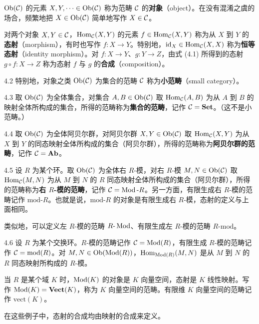 $\operatorname{Ob}(\mathcal{C})$ 的元素 $X,Y,\dots\in\operatorname{Ob}(\mathcal{C})$ 称为范畴 $\mathcal{C}$ 的\textbf{对象}（object）。在没有混淆之虞的场合，频繁地把 $X\in\operatorname{Ob}(\mathcal{C})$ 简单地写作 $X\in\mathcal{C}$。

对两个对象 $X,Y\in\mathcal{C}$，$\operatorname{Hom}_{\mathcal{C}}(X,Y)$ 的元素 $f\in\operatorname{Hom}_{\mathcal{C}}(X,Y)$ 称为从 $X$ 到 $Y$ 的\textbf{态射}（morphism），有时也写作 $f\colon X\to Y$。特别地，$\mathrm{id}_X\in\operatorname{Hom}_{\mathcal{C}}(X,X)$ 称为\textbf{恒等态射}（identity morphism）。对 $f\colon X\to Y$、$g\colon Y\to Z$，由式 (4.1) 所得到的态射 $g\circ f\colon X\to Z$ 称为态射 $f$ 与 $g$ 的\textbf{合成}（composition）。

\begin{definition}{4.2}
特别地，对象之类 $\operatorname{Ob}(\mathcal{C})$ 为集合的范畴 $\mathcal{C}$ 称为\textbf{小范畴}（small category）。
\end{definition}

\begin{example}{4.3}
取 $\operatorname{Ob}(\mathcal{C})$ 为全体集合，对集合 $A,B\in\operatorname{Ob}(\mathcal{C})$ 取 $\operatorname{Hom}_{\mathcal{C}}(A,B)$ 为从 $A$ 到 $B$ 的映射全体所构成的集合，所得的范畴称为\textbf{集合的范畴}，记作 $\mathcal{C}=\mathbf{Set}$。（这不是小范畴。）
\end{example}

\begin{example}{4.4}
取 $\operatorname{Ob}(\mathcal{C})$ 为全体阿贝尔群，对阿贝尔群 $X,Y\in\operatorname{Ob}(\mathcal{C})$ 取 $\operatorname{Hom}_{\mathcal{C}}(X,Y)$ 为从 $X$ 到 $Y$ 的同态映射全体所构成的集合（阿贝尔群），所得的范畴称为\textbf{阿贝尔群的范畴}，记作 $\mathcal{C}=\mathbf{Ab}$。
\end{example}

\begin{example}{4.5}
设 $R$ 为某个环。取 $\operatorname{Ob}(\mathcal{C})$ 为全体右 $R$-模，对右 $R$-模 $M,N\in\operatorname{Ob}(\mathcal{C})$ 取 $\operatorname{Hom}_{\mathcal{C}}(M,N)$ 为从 $M$ 到 $N$ 的 $R$ 同态映射全体所构成的集合（阿贝尔群），所得的范畴称为\textbf{右 $R$-模的范畴}，记作 $\mathcal{C}=\operatorname{Mod}\text{-}R$。另一方面，有限生成右 $R$-模的范畴记作 $\mathrm{mod}\text{-}R$。也就是说，$\mathrm{mod}\text{-}R$ 的对象是有限生成右 $R$-模，态射的定义与上面相同。

类似地，可以定义左 $R$-模的范畴 $R\text{-}\operatorname{Mod}$、有限生成左 $R$-模的范畴 $R\text{-}\mathrm{mod}$。
\end{example}

\begin{example}{4.6}
设 $R$ 为某个交换环。$R$-模的范畴记作 $\mathcal{C}=\operatorname{Mod}(R)$，有限生成 $R$-模的范畴记作 $\mathcal{C}=\mathrm{mod}(R)$。对 $M,N\in\operatorname{Ob}(\operatorname{Mod}(R))$，$\operatorname{Hom}_{\operatorname{Mod}(R)}(M,N)$ 是从 $M$ 到 $N$ 的 $R$ 同态映射所构成的 $R$-模。

当 $R$ 是某个域 $K$ 时，$\operatorname{Mod}(K)$ 的对象是 $K$ 向量空间，态射是 $K$ 线性映射。写作 $\operatorname{Mod}(K)=\mathbf{Vect}(K)$，称为 $K$ 向量空间的范畴。有限维 $K$ 向量空间的范畴记作 $\mathrm{vect}(K)$。

在这些例子中，态射的合成均由映射的合成来定义。
\end{example}

